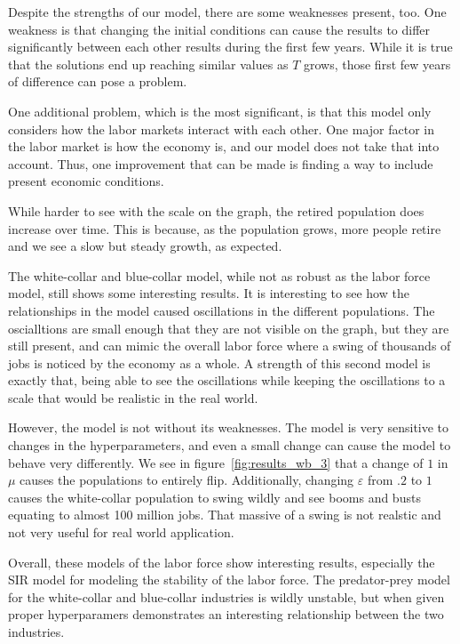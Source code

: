 \documentclass[11pt]{amsart}
\begin{document}
Despite the strengths of our model, there are some weaknesses present, too. One weakness is that
changing the initial conditions can cause the results to differ significantly between each other results during the first few years.
While it is true that the solutions end up reaching similar values as $T$ grows, those first few years of difference can pose a problem.

One additional problem, which is the most significant, is that this model only considers how the labor markets interact
with each other. One major factor in the labor market is how the economy is, and our model does not take that into account.
Thus, one improvement that can be made is finding a way to include present economic conditions.

While harder to see with the scale on the graph, the retired population does increase over time. 
This is because, as the population grows, more people retire and we see a slow but steady growth, as expected.

The white-collar and blue-collar model, while not as robust as the labor force model, still shows some interesting results. It is interesting to see how the relationships in the model
caused oscillations in the different populations. The oscialltions are small enough that they are not visible on the graph, but they are still present, and can mimic the overall 
labor force where a swing of thousands of jobs is noticed by the economy as a whole. A strength of this second model is exactly that, being able to see the oscillations while
keeping the oscillations to a scale that would be realistic in the real world.

However, the model is not without its weaknesses. The model is very sensitive to changes in the hyperparameters, and even a small change can cause the model to behave very differently. We see
in figure~\ref{fig:results_wb_3} that a change of $1$ in $\mu$ causes the populations to entirely flip. Additionally, changing $\varepsilon$ from $.2$ to $1$ causes 
the white-collar population to swing wildly and see booms and busts equating to almost 100 million jobs. That massive of a swing is not realstic and not very useful for real world application.

Overall, these models of the labor force show interesting results, especially the SIR model for modeling the stability of the labor force. The predator-prey model for the white-collar and blue-collar
industries is wildly unstable, but when given proper hyperparamers demonstrates an interesting relationship between the two industries.



\newpage 


\end{document}
